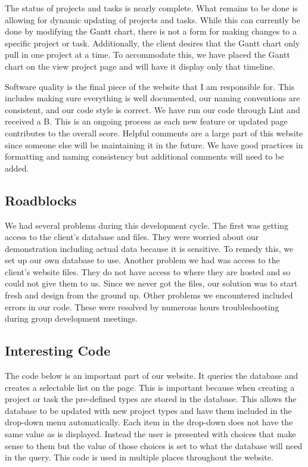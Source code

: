 \documentclass[letterpaper,10pt,titlepage,journal,compsoc,draftclsnofoot,onecolumn]{IEEEtran}
\newcommand\tab[1][1cm]{\hspace*{#1}}
\begin{document}
\tab
The status of projects and tasks is nearly complete. What remains to be done is allowing for dynamic updating of projects and tasks. While this can currently be done by modifying the Gantt chart, there is not a form for making changes to a specific project or task. Additionally, the client desires that the Gantt chart only pull in one project at a time. To accommodate this, we have placed the Gantt chart on the view project page and will have it display only that timeline. 
\newline

\tab
Software quality is the final piece of the website that I am responsible for. This includes making sure everything is well documented, our naming conventions are consistent, and our code style is correct. We have run our code through Lint and received a B. This is an ongoing process as each new feature or updated page contributes to the overall score. Helpful comments are a large part of this website since someone else will be maintaining it in the future. We have good practices in formatting and naming consistency but additional comments will need to be added.
\newline



\subsection{Roadblocks}

\tab
We had several problems during this development cycle. The first was getting access to the client’s database and files. They were worried about our demonstration including actual data because it is sensitive. To remedy this, we set up our own database to use. Another problem we had was access to the client’s website files. They do not have access to where they are hosted and so could not give them to us. Since we never got the files, our solution was to start fresh and design from the ground up. Other problems we encountered included errors in our code. These were resolved by numerous hours troubleshooting during group development meetings.

\subsection{Interesting Code}

\tab
The code below is an important part of our website. It queries the database and creates a selectable list on the page. This is important because when creating a project or task the pre-defined types are stored in the database. This allows the database to be updated with new project types and have them included in the drop-down menu automatically. Each item in the drop-down does not have the same value as is displayed. Instead the user is presented with choices that make sense to them but the value of those choices is set to what the database will need in the query. This code is used in multiple places throughout the website.
\newline
\end{document}
